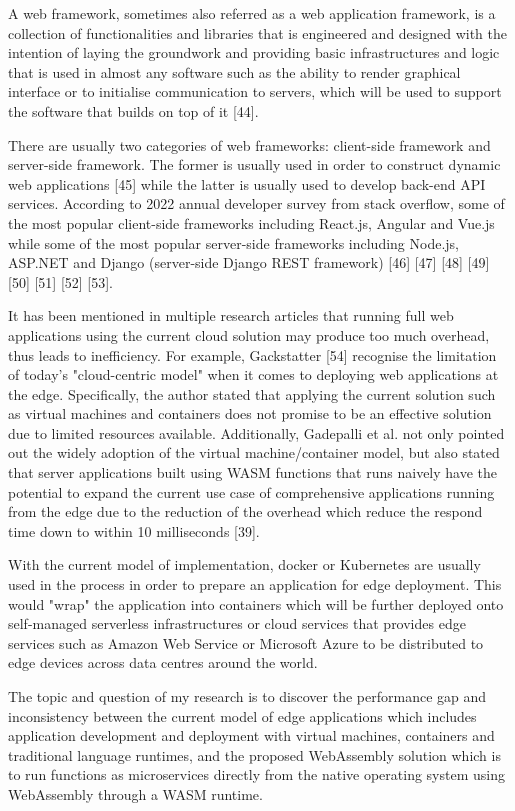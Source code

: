 \bigskip

A web framework, sometimes also referred as a web application framework, is a collection of functionalities and libraries that is engineered and designed with the intention of laying the groundwork and providing basic infrastructures and logic that is used in almost any software such as the ability to render graphical interface or to initialise communication to servers, which will be used to support the software that builds on top of it [44].

There are usually two categories of web frameworks: client-side framework and server-side framework. The former is usually used in order to construct dynamic web applications [45] while the latter is usually used to develop back-end API services. According to 2022 annual developer survey from stack overflow, some of the most popular client-side frameworks including React.js, Angular and Vue.js while some of the most popular server-side frameworks including Node.js, ASP.NET and Django (server-side Django REST framework) [46] [47] [48] [49] [50] [51] [52] [53].

It has been mentioned in multiple research articles that running full web applications using the current cloud solution may produce too much overhead, thus leads to inefficiency. For example, Gackstatter [54] recognise the limitation of today's "cloud-centric model" when it comes to deploying web applications at the edge. Specifically, the author stated that applying the current solution such as virtual machines and containers does not promise to be an effective solution due to limited resources available. Additionally, Gadepalli et al. not only pointed out the widely adoption of the virtual machine/container model, but also stated that server applications built using WASM functions that runs naively have the potential to expand the current use case of comprehensive applications running from the edge due to the reduction of the overhead which reduce the respond time down to within 10 milliseconds [39].

With the current model of implementation, docker or Kubernetes are usually used in the process in order to prepare an application for edge deployment. This would "wrap" the application into containers which will be further deployed onto self-managed serverless infrastructures or cloud services that provides edge services such as Amazon Web Service or Microsoft Azure to be distributed to edge devices across data centres around the world.

The topic and question of my research is to discover the performance gap and inconsistency between the current model of edge applications which includes application development and deployment with virtual machines, containers and traditional language runtimes, and the proposed WebAssembly solution which is to run functions as microservices directly from the native operating system using WebAssembly through a WASM runtime.

